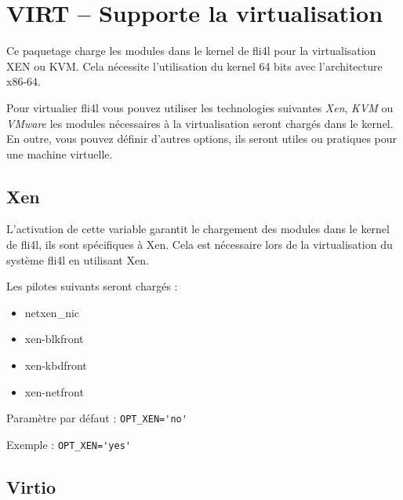 
\section{VIRT -- Supporte la virtualisation}

Ce paquetage charge les modules dans le kernel de fli4l pour la
virtualisation XEN ou KVM. Cela nécessite l'utilisation du kernel
64 bits avec l'architecture x86-64.

Pour virtualier fli4l vous pouvez utiliser les technologies suivantes
\emph {Xen}, \emph {KVM} ou \emph{VMware} les modules nécessaires à
la virtualisation seront chargés dans le kernel. En outre, vous pouvez
définir d'autres options, ils seront utiles ou pratiques pour 
une machine virtuelle.

\subsection{Xen}

\begin{description}

L'activation de cette variable garantit le chargement des modules dans
le kernel de fli4l, ils sont spécifiques à Xen. Cela est nécessaire lors de
la virtualisation du système fli4l en utilisant Xen.

Les pilotes suivants seront chargés :

\begin{itemize}
   \item netxen\_nic
   \item xen-blkfront
   \item xen-kbdfront
   \item xen-netfront
\end{itemize}

Paramètre par défaut : \verb+OPT_XEN='no'+

Exemple : \verb+OPT_XEN='yes'+

\end{description}

\subsection{Virtio}


